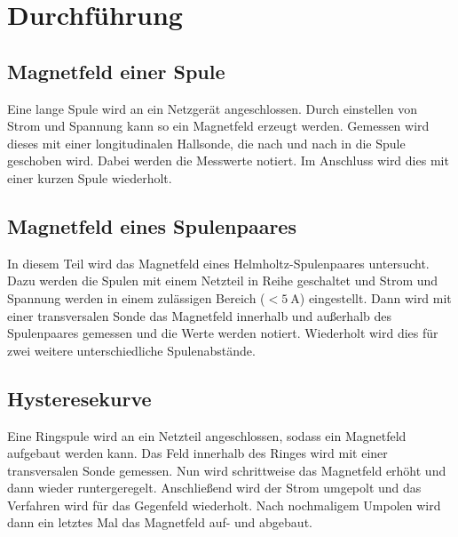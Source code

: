 \section{Durchführung}
\label{sec:Durchführung}

\subsection{Magnetfeld einer Spule}
Eine lange Spule wird an ein Netzgerät angeschlossen. Durch einstellen von Strom und Spannung kann so ein Magnetfeld erzeugt werden. Gemessen wird dieses mit einer longitudinalen Hallsonde, die nach und nach in die
Spule geschoben wird. Dabei werden die Messwerte notiert. Im Anschluss wird dies mit einer kurzen Spule wiederholt.

\subsection{Magnetfeld eines Spulenpaares}
In diesem Teil wird das Magnetfeld eines Helmholtz-Spulenpaares untersucht. Dazu werden die Spulen mit einem Netzteil in Reihe geschaltet und Strom und Spannung werden in einem zulässigen Bereich ($< \SI{5}{\ampere}$) eingestellt.
Dann wird mit einer transversalen Sonde das Magnetfeld innerhalb und außerhalb des Spulenpaares gemessen und die Werte werden notiert. Wiederholt wird dies für zwei weitere unterschiedliche Spulenabstände.

\subsection{Hysteresekurve}
Eine Ringspule wird an ein Netzteil angeschlossen, sodass ein Magnetfeld aufgebaut werden kann. Das Feld innerhalb des Ringes wird mit einer transversalen Sonde gemessen. Nun wird schrittweise das Magnetfeld erhöht und 
dann wieder runtergeregelt. Anschließend wird der Strom umgepolt und das Verfahren wird für das Gegenfeld wiederholt. Nach nochmaligem Umpolen wird dann ein letztes Mal das Magnetfeld auf- und abgebaut.